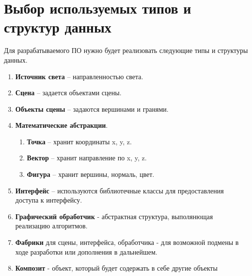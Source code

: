 \section{Выбор используемых типов и структур данных}
Для разрабатываемого ПО нужно будет реализовать следующие типы и
структуры данных.
\begin{enumerate}
\item \textbf{Источник света} – направленностью света.
\item \textbf{Сцена} – задается объектами сцены.
\item \textbf{Объекты сцены} – задаются вершинами и гранями.
\item \textbf{Математические абстракции}.
    \begin{enumerate}
        \item \textbf{Точка} – хранит координаты x, y, z.
        \item \textbf{Вектор} – хранит направление по x, y, z.
        \item \textbf{Фигура} – хранит вершины, нормаль, цвет.
    \end{enumerate}
\item \textbf{Интерфейс} – используются библиотечные классы для предоставления доступа к интерфейсу.
\item \textbf{Графический обработчик} - абстрактная структура, выполянющая реализацию алгоритмов.
\item \textbf{Фабрики} для сцены, интерфейса, обработчика - для возможной подмены в ходе разработки или дополнения в дальнейшем.
\item \textbf{Композит} - объект, который будет содержать в себе другие объекты
\end{enumerate}
